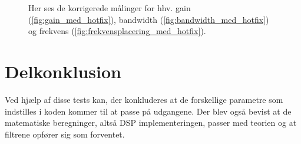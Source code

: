 \begin{figure}[h!]
	\centering
  	\caption{Her ses de korrigerede målinger for hhv. gain (\ref{fig:gain_med_hotfix}), bandwidth (\ref{fig:bandwidth_med_hotfix}) og frekvens (\ref{fig:frekvensplacering_med_hotfix}).}
	\label{fig:korr}
\end{figure}

\section{Delkonklusion}

Ved hjælp af disse tests kan, der konkluderes at de forskellige parametre som indstilles i koden kommer til at passe på udgangene. Der blev også bevist at de matematiske beregninger, altså DSP implementeringen, passer med teorien og at filtrene opfører sig som forventet. \\


